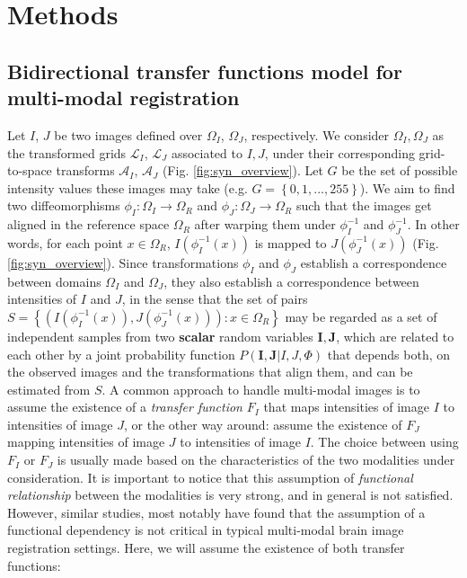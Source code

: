 \section{Methods}
\subsection{Bidirectional transfer functions model for multi-modal registration}\label{sec:syn_em}

Let $I$, $J$ be two images defined over $\Omega_{I}$, $\Omega_{J}$, respectively. We consider $\Omega_{I}, \Omega_{J}$ as the transformed grids $\mathcal{L}_{I}$, $\mathcal{L}_{J}$ associated to $I, J$, under their corresponding grid-to-space transforms $\mathcal{A}_{I}$, $\mathcal{A}_{J}$ (Fig. \ref{fig:syn_overview}). Let $G$ be the set of possible intensity values these images may take (e.g. $G=\left\lbrace 0,1,...,255\right\rbrace$). We aim to find two diffeomorphisms $\phi_{I}:\Omega_{I}\rightarrow \Omega_{R}$ and $\phi_{J}:\Omega_{J}\rightarrow \Omega_{R}$ such that the images get aligned in the reference space $\Omega_{R}$ after warping them under $\phi_{I}^{-1}$ and $\phi_{J}^{-1}$. In other words, for each point $x \in \Omega_{R}$, $I(\phi_{I}^{-1}(x))$ is mapped to $J(\phi_{J}^{-1}(x))$
(Fig. \ref{fig:syn_overview}). Since transformations $\phi_{I}$ and $\phi_{J}$ establish a correspondence between domains $\Omega_{I}$ and $\Omega_{J}$, they also establish a correspondence between intensities of $I$ and $J$, in the sense that the set of pairs $S = \left\lbrace \left( I(\phi_{I}^{-1}(x)), J(\phi_{J}^{-1}(x))\right): x\in\Omega_{R}\right\rbrace$ may be regarded as a set of independent samples from two \textbf{scalar} random variables $\mathbf{I}, \mathbf{J}$, which are related to each other by a joint probability function $P(\mathbf{I}, \mathbf{J} | I, J, \Phi)$ that depends both, on the observed images and the transformations that align them, and can be estimated from $S$. A common approach to handle multi-modal images is to assume the existence of a \emph{transfer function} $F_{I}$ that maps intensities of image $I$ to intensities of image $J$, or the other way around: assume the existence of $F_{J}$ mapping intensities of image $J$ to intensities of image $I$. The choice between using $F_{I}$ or $F_{J}$ is usually made based on the characteristics of the two modalities under consideration. It is important to notice that this assumption of \emph{functional relationship} between the modalities is very strong, and in general is not satisfied. However, similar studies, most notably \cite{Roche1998} have found that the assumption of a functional dependency is not critical in typical multi-modal brain image registration settings. Here, we will assume the existence of both transfer functions:
